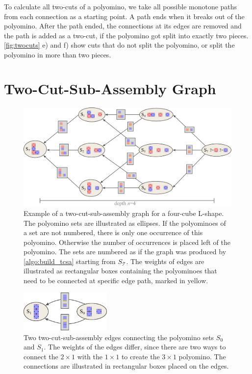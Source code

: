 To calculate all two-cuts of a polyomino, we take all possible monotone paths from each connection as a starting point.
A path ends when it breaks out of the polyomino.
After the path ended, the connections at its edges are removed and the path is added as a two-cut, if the polyomino got split into exactly two pieces.
\autoref{fig:twocuts} e) and f) show cuts that do not split the polyomino, or split the polyomino in more than two pieces.


\section{Two-Cut-Sub-Assembly Graph}
\label{sec:tcsa}

\begin{figure}
	\centering
	\includegraphics[width=1\textwidth]{figures/tcsa.pdf}
	\caption[Example of a two-cut-sub-assembly graph]{Example of a two-cut-sub-assembly graph for a four-cube L-shape. The polyomino sets are illustrated as ellipses. If the polyominoes of a set are not numbered, there is only one occurrence of this polyomino. Otherwise the number of occurrences is placed left of the polyomino. The sets are numbered as if the graph was produced by \autoref{algo:build_tcsa} starting from $S_\mathcal{T}$. The weights of edges are illustrated as rectangular boxes containing the polyominoes that need to be connected at specific edge path, marked in yellow.}
	\label{fig:tcsa}
\end{figure}

\begin{figure}
	\centering
	\includegraphics[width=0.4\textwidth]{figures/tcsa_multiedge.pdf}
	\caption[Two-cut-sub-assembly nodes connected with multiple edges]{Two two-cut-sub-assembly edges connecting the polyomino sets $S_0$ and $S_1$. The weights of the edges differ, since there are two ways to connect the $2\times1$ with the $1\times1$ to create the $3\times1$ polyomino. The connections are illustrated in rectangular boxes placed on the edges.}
	\label{fig:tcsa_multiedge}
\end{figure}

